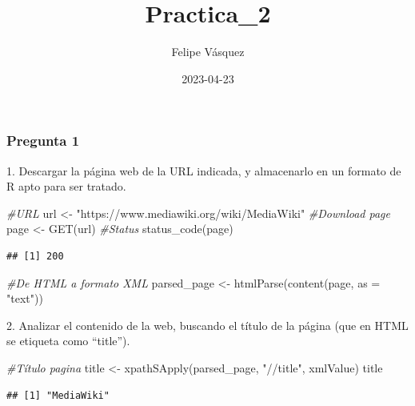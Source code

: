 \documentclass[
]{article}
\title{Practica\_2}
\author{Felipe Vásquez}
\date{2023-04-23}
\newenvironment{Shaded}{\begin{snugshade}}{\end{snugshade}}
\newcommand{\AttributeTok}[1]{\textcolor[rgb]{0.77,0.63,0.00}{#1}}
\newcommand{\CommentTok}[1]{\textcolor[rgb]{0.56,0.35,0.01}{\textit{#1}}}
\newcommand{\FunctionTok}[1]{\textcolor[rgb]{0.00,0.00,0.00}{#1}}
\newcommand{\NormalTok}[1]{#1}
\newcommand{\OtherTok}[1]{\textcolor[rgb]{0.56,0.35,0.01}{#1}}
\newcommand{\StringTok}[1]{\textcolor[rgb]{0.31,0.60,0.02}{#1}}
\begin{document}
\maketitle

{
\setcounter{tocdepth}{2}
\tableofcontents
}
\hypertarget{pregunta-1}{%
\subsubsection{Pregunta 1}\label{pregunta-1}}

1. Descargar la página web de la URL indicada, y almacenarlo en un
formato de R apto para ser tratado.

\begin{Shaded}
\begin{Highlighting}[]
\CommentTok{\#URL}
\NormalTok{url }\OtherTok{\textless{}{-}} \StringTok{"https://www.mediawiki.org/wiki/MediaWiki"}
\CommentTok{\#Download page}
\NormalTok{page }\OtherTok{\textless{}{-}} \FunctionTok{GET}\NormalTok{(url)}
\CommentTok{\#Status}
\FunctionTok{status\_code}\NormalTok{(page)}
\end{Highlighting}
\end{Shaded}

\begin{verbatim}
## [1] 200
\end{verbatim}

\begin{Shaded}
\begin{Highlighting}[]
\CommentTok{\#De HTML a formato XML}
\NormalTok{parsed\_page }\OtherTok{\textless{}{-}} \FunctionTok{htmlParse}\NormalTok{(}\FunctionTok{content}\NormalTok{(page, }\AttributeTok{as =} \StringTok{"text"}\NormalTok{))}
\end{Highlighting}
\end{Shaded}

2. Analizar el contenido de la web, buscando el título de la página (que
en HTML se etiqueta como ``title'').

\begin{Shaded}
\begin{Highlighting}[]
\CommentTok{\#Título pagina}
\NormalTok{title }\OtherTok{\textless{}{-}} \FunctionTok{xpathSApply}\NormalTok{(parsed\_page, }\StringTok{"//title"}\NormalTok{, xmlValue)}
\NormalTok{title}
\end{Highlighting}
\end{Shaded}

\begin{verbatim}
## [1] "MediaWiki"
\end{verbatim}
\end{document}
